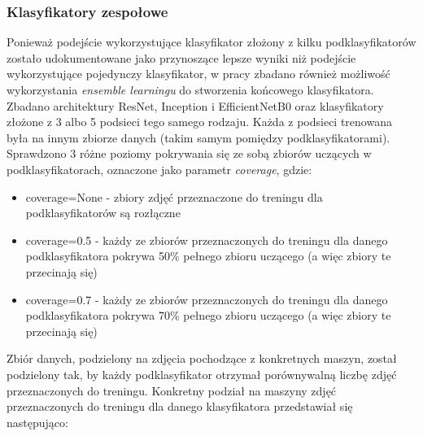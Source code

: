 \documentclass[polish,12pt]{aghthesis}
\begin{document}
\subsubsection{Klasyfikatory zespołowe}
\par\noindent Ponieważ podejście wykorzystujące klasyfikator złożony z kilku podklasyfikatorów zostało udokumentowane jako przynoszące lepsze wyniki niż podejście wykorzystujące pojedynczy klasyfikator\cite{artRen}, w pracy zbadano również możliwość wykorzystania \textit{ensemble learningu} do stworzenia końcowego klasyfikatora. Zbadano architektury ResNet, Inception i EfficientNetB0 oraz klasyfikatory złożone z 3 albo 5 podsieci tego samego rodzaju. 
\newline Każda z podsieci trenowana była na innym zbiorze danych (takim samym pomiędzy podklasyfikatorami). Sprawdzono 3 różne poziomy pokrywania się ze sobą zbiorów uczących w podklasyfikatorach, oznaczone jako parametr \textit{coverage}, gdzie:
\begin{itemize}
    \item coverage=None - zbiory zdjęć przeznaczone do treningu dla podklasyfikatorów są rozłączne
    \item coverage=0.5 - każdy ze zbiorów przeznaczonych do treningu dla danego podklasyfikatora pokrywa 50\% pełnego zbioru uczącego (a więc zbiory te przecinają się)
    \item coverage=0.7 - każdy ze zbiorów przeznaczonych do treningu dla danego podklasyfikatora pokrywa 70\% pełnego zbioru uczącego (a więc zbiory te przecinają się)
\end{itemize}
Zbiór danych, podzielony na zdjęcia pochodzące z konkretnych maszyn, został podzielony tak, by każdy podklasyfikator otrzymał porównywalną liczbę zdjęć przeznaczonych do treningu. Konkretny podział na maszyny zdjęć przeznaczonych do treningu dla danego klasyfikatora przedstawiał się następująco: 
\end{document}
